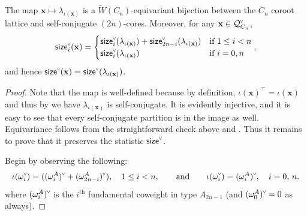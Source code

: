 \documentclass[ALCO,published]{cedram}
\newcommand{\chk}[1]{#1^{\normalfont\smash{\scalebox{.5}[.5]{\rotatebox{90}{\textbf{\textless}}}}}}
\newcommand{\wa}{\widetilde{W}}
\newcommand{\Q}{\mathcal{Q}}
\newcommand{\size}{{\sf size}}
\begin{document}
\begin{theorem}
\label{thm:cn_cores}
The map $\mathbf{x}\mapsto \lambda_{\iota(\mathbf{x})}$ is a $\wa(C_n)$-equivariant bijection between the $C_n$ coroot lattice and self-conjugate $(2n)$-cores.  Moreover, for any $\mathbf{x} \in \chk{\Q}_{C_n}$, 
\[
\chk{\size}_i(\mathbf{x})=
\begin{cases}
\chk{\size}_i(\lambda_{\iota(\mathbf{x})}) + \chk{\size}_{2n-i}(\lambda_{\iota(\mathbf{x})}) & \text{if } 1\leq i<n \\ 
\chk{\size}_i(\lambda_{\iota(\mathbf{x})}) & \text{if } i=0,n\end{cases}
,
\] and hence
$\chk{\size}(\mathbf{x})=\chk{\size}(\lambda_{\iota(\mathbf{x})})$.
\end{theorem}

\begin{proof}
Note that the map is well-defined because by definition, $\iota(\mathbf{x})^\intercal=\iota(\mathbf{x})$ and thus by  we have $\lambda_{\iota(\mathbf{x})}$ is self-conjugate. It is evidently injective, and it is easy to see that every self-conjugate partition is in the image as well. Equivariance follows from the straightforward check above and . Thus it remains to prove that it preserves the statistic $\chk{\size}$. 

Begin by observing the following:
\[ 
\iota(\chk{\omega_i}) = (\chk{(\omega_i^A)}+\chk{(\omega_{2n-i}^A)}),
\quad 1\leq i<n,
\qquad\text{and}\qquad
\iota(\chk{\omega_i}) = \chk{(\omega_i^A)}, 
\quad i=0,\,n.
\]
where $\chk{(\omega_i^A)}$ is the $i^\text{th}$ fundamental coweight in type $A_{2n-1}$ (and $\chk{(\omega_0^A)}=0$ as always).


\end{proof}
\end{document}
